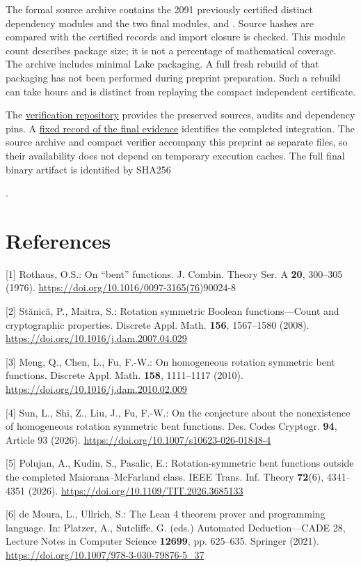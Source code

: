 \documentclass[11pt,a4paper]{article}
\begin{document}
The formal source archive contains the 2091 previously certified distinct dependency modules and the two final modules,  and . Source hashes are compared with the certified records and import closure is checked. This module count describes package size; it is not a percentage of mathematical coverage. The archive includes minimal Lake packaging. A full fresh rebuild of that packaging has not been performed during preprint preparation. Such a rebuild can take hours and is distinct from replaying the compact independent certificate.

The \href{https://github.com/contatofilipevono-rgb/hrsbf-bent-verification}{verification repository} provides the preserved sources, audits and dependency pins. A \href{https://github.com/contatofilipevono-rgb/hrsbf-bent-verification/tree/9be0d98/research_updates/2026_10_20_final_integration}{fixed record of the final evidence} identifies the completed integration. The source archive and compact verifier accompany this preprint as separate files, so their availability does not depend on temporary execution caches. The full final binary artifact is identified by SHA256

.

\section*{References}

[1] Rothaus, O.S.: On ``bent'' functions. J. Combin. Theory Ser. A \textbf{20}, 300--305 (1976). \url{https://doi.org/10.1016/0097-3165(76})90024-8

[2] St\u{a}nic\u{a}, P., Maitra, S.: Rotation symmetric Boolean functions---Count and cryptographic properties. Discrete Appl. Math. \textbf{156}, 1567--1580 (2008). \url{https://doi.org/10.1016/j.dam.2007.04.029}

[3] Meng, Q., Chen, L., Fu, F.-W.: On homogeneous rotation symmetric bent functions. Discrete Appl. Math. \textbf{158}, 1111--1117 (2010). \url{https://doi.org/10.1016/j.dam.2010.02.009}

[4] Sun, L., Shi, Z., Liu, J., Fu, F.-W.: On the conjecture about the nonexistence of homogeneous rotation symmetric bent functions. Des. Codes Cryptogr. \textbf{94}, Article 93 (2026). \url{https://doi.org/10.1007/s10623-026-01848-4}

[5] Polujan, A., Kudin, S., Pasalic, E.: Rotation-symmetric bent functions outside the completed Maiorana--McFarland class. IEEE Trans. Inf. Theory \textbf{72}(6), 4341--4351 (2026). \url{https://doi.org/10.1109/TIT.2026.3685133}

[6] de Moura, L., Ullrich, S.: The Lean 4 theorem prover and programming language. In: Platzer, A., Sutcliffe, G. (eds.) Automated Deduction---CADE 28, Lecture Notes in Computer Science \textbf{12699}, pp. 625--635. Springer (2021). \url{https://doi.org/10.1007/978-3-030-79876-5\_37}
\end{document}
